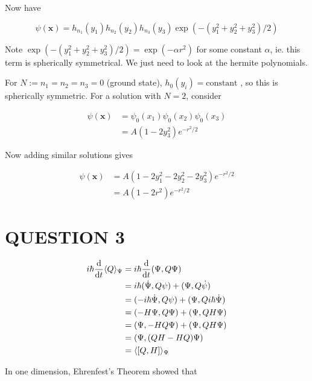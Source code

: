 \documentclass[a4paper]{article}
\begin{document}
Now have

\[ \psi(\mathbf{x}) = h_{n_{1}}(y_{1})h_{n_{2}}(y_{2})h_{n_{3}}(y_{3})  \exp \left(  -(y_{1}^{2} + y_{2}^{2} + y_{3}^{2})/2 \right) \]


Note $  \exp \left(  -(y_{1}^{2} + y_{2}^{2} + y_{3}^{2})/2 \right) = \exp(- \alpha r^{2}) $ for some constant $ \alpha $, ie. this term is spherically symmetrical. We just need to look at the hermite polynomials.


For $ N := n_{1} = n_{2} = n_{3} = 0 $ (ground state), $ h_{0}(y_{i}) = \text{constant } $, so this is spherically symmetric. For a solution with $ N = 2 $, consider

\begin{align*}
 \psi(\mathbf{x}) & = \psi_{0}(x_{1})\psi_{0}(x_{2}) \psi_{0}(x_{3}) \\
& = A (1 - 2y_{3}^{2}) e^{- r^{2}/2}
\end{align*}

Now adding similar solutions gives

\begin{align*}
 \psi(\mathbf{x}) & = A ( 1 - 2y_{1}^{2}   - 2y_{2}^{2} - 2y_{3}^{2}  ) e^{- r^{2}/2} \\
 & = A ( 1 - 2r^{2} ) e^{- r^{2}/2}
\end{align*}









 
 

\section{QUESTION 3}


\begin{align*}
i \hbar \frac{\mathrm{d} }{\mathrm{d} t} \langle Q \rangle_{\Psi} & = i \hbar \frac{\mathrm{d} }{\mathrm{d} t} ( \Psi,  Q \Psi)  \\
& = i \hbar (\dot{\Psi}, Q \psi )+ (\Psi,  Q \dot{\psi}) \\
& = (- i \hbar \dot{\Psi}, Q \psi ) + (\Psi, Q i \hbar \dot{\Psi} ) \\
& = (- H \Psi, Q \Psi) + (\Psi, QH \Psi) \\
& = (\Psi, - H Q \Psi) + (\Psi, QH \Psi) \\
& = (\Psi, (QH - HQ) \Psi ) \\
& = \langle [Q,H] \rangle_{\Psi}
\end{align*}


In one dimension, Ehrenfest's Theorem showed that
\end{document}

